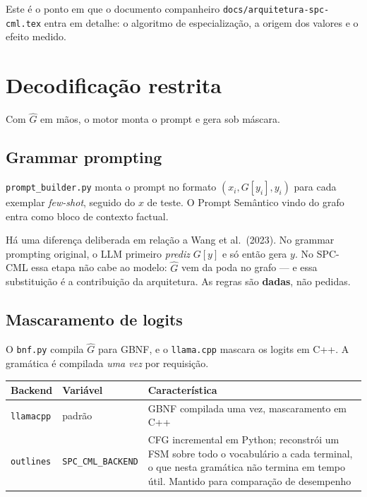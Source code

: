 \documentclass[11pt,a4paper]{article}
\newcommand{\arq}[1]{\texttt{\small #1}}
\begin{document}
Este é o ponto em que o documento companheiro
\arq{docs/arquitetura-spc-cml.tex} entra em detalhe: o algoritmo de
especialização, a origem dos valores e o efeito medido.

\section{Decodificação restrita}

Com $\hat{G}$ em mãos, o motor monta o prompt e gera sob máscara.

\subsection{Grammar prompting}

\arq{prompt\_builder.py} monta o prompt no formato $(x_i, G[y_i], y_i)$ para
cada exemplar \emph{few-shot}, seguido do $x$ de teste. O Prompt Semântico vindo
do grafo entra como bloco de contexto factual.

Há uma diferença deliberada em relação a Wang et al.\ (2023). No grammar
prompting original, o LLM primeiro \emph{prediz} $G[y]$ e só então gera $y$. No
SPC-CML essa etapa não cabe ao modelo: $\hat{G}$ vem da poda no grafo --- e essa
substituição é a contribuição da arquitetura. As regras são \textbf{dadas}, não
pedidas.

\subsection{Mascaramento de logits}

O \arq{bnf.py} compila $\hat{G}$ para GBNF, e o \texttt{llama.cpp} mascara os
logits em C++. A gramática é compilada \emph{uma vez} por requisição.

\begin{center}
\small
\begin{tabular}{@{}llp{7.6cm}@{}}
\toprule
\textbf{Backend} & \textbf{Variável} & \textbf{Característica}\\
\midrule
\texttt{llamacpp} & padrão & GBNF compilada uma vez, mascaramento em C++\\
\texttt{outlines} & \texttt{SPC\_CML\_BACKEND} & CFG incremental em Python;
reconstrói um FSM sobre todo o vocabulário a cada terminal, o que nesta
gramática não termina em tempo útil. Mantido para comparação de desempenho\\
\bottomrule
\end{tabular}
\end{center}
\end{document}
